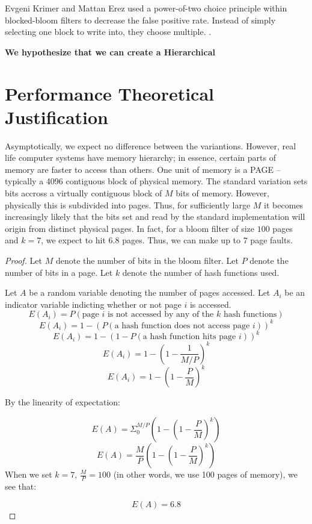 \documentclass[a4paper]{article}
\theoremstyle{plain}
\theoremstyle{definition}
\begin{document}
	Evgeni Krimer and Mattan Erez used a power-of-two choice principle within blocked-bloom filters to decrease the false positive rate.
	Instead of simply selecting one block to write into, they choose multiple.
	\cite{Krimer}.

	\textbf{We hypothesize that we can create a Hierarchical}

	\section{Performance Theoretical Justification}
	Asymptotically, we expect no difference between the variantions.
	However, real life computer systems have memory hierarchy;
	in essence, certain parts of memory are faster to access than others.
	One unit of memory is a PAGE -- typically a 4096 contiguous block of physical memory.
	The standard variation sets bits accross a virtually contiguous block of $M$ bits of memory.
	However, physically this is subdivided into pages. 
	Thus, for sufficiently large $M$ it becomes increasingly likely that the bits set and read by the standard implementation will origin from distinct physical pages.
	In fact, for a bloom filter of size $100$ pages and $k=7$, we expect to hit $6.8$ pages. Thus, we can make up to $7$ page faults.
	
	
	\begin{proof}
		Let $M$ denote the number of bits in the bloom filter. 
		Let $P$ denote the number of bits in a page. 
		Let $k$ denote the number of hash functions used.

		Let $A$ be a random variable denoting the number of pages accessed.
		Let $A_i$ be an indicator variable indicting whether or not page $i$ is accessed.
		$$E(A_i) = P(\text{page $i$ is not accessed by any of the $k$ hash functions})$$
		$$E(A_i) = 1 - (P(\text{a hash function does not access page $i$}))^k$$
		$$E(A_i) = 1 - (1-P(\text{a hash function hits page $i$}))^k$$
		$$E(A_i) = 1 - (1-\frac{1}{M/P})^k$$
		$$E(A_i) = 1 - (1-\frac{P}{M})^k$$

		By the linearity of expectation:
		
		$$E(A) = \Sigma_0^{M/P} (1 - (1-\frac{P}{M})^k)$$
		$$E(A) = \frac{M}{P}(1 - (1-\frac{P}{M})^k)$$
		When we set $k=7$, $\frac{M}{P} = 100$ (in other words, we use 100 pages of memory), we see that:

		$$E(A) = 6.8$$



	\end{proof}
\end{document}

